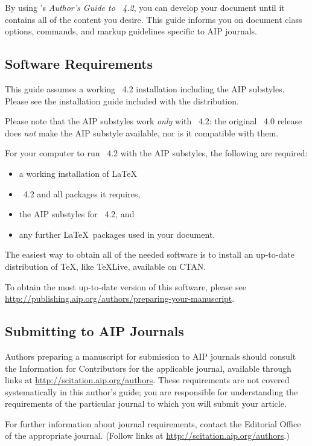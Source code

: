 \documentclass[%
 reprint,%
 amssymb, amsmath,%
 aip,cha,%
]{revtex4-2}
\begin{document}
By using \revtex's \textit{Author's Guide to \revtex~4.2}, you can develop your
document until it contains all of the content you desire.
This guide informs you on document class options, commands, and 
markup guidelines specific to AIP journals. 

\subsection{Software Requirements}

This guide assumes a working \revtex~4.2 installation including the AIP substyles. 
Please see the installation guide included with the distribution.\cite{Note1}

Please note that the AIP substyles work {\it only} with \revtex~4.2: 
the original \revtex~4.0 release does {\it not} make the AIP substyle available, nor is it compatible with them. 

For your computer to run \revtex~4.2 with the AIP substyles, the following are required:
\begin{itemize}
\item
a working installation of \LaTeX\,
\item
\revtex~4.2 and all packages it requires,
\item
the AIP substyles for \revtex~4.2, and
\item
any further \LaTeX\ packages used in your document. 
\end{itemize}

The easiest way to obtain all of the needed software is to install an up-to-date distribution of \TeX,
like \TeX Live, available on CTAN.

To obtain the most up-to-date version of this software, please see \url{http://publishing.aip.org/authors/preparing-your-manuscript}.


\subsection{Submitting to AIP Journals}

Authors preparing a manuscript for submission to
AIP journals should consult the Information for Contributors for the applicable journal,
available through links at \url{http://scitation.aip.org/authors}. 
These requirements are not covered systematically in this author's guide; 
you are responsible for understanding the requirements of the particular journal to which
you will submit your article.

For further information about journal requirements, contact the Editorial
Office of the appropriate journal. (Follow links at \url{http://scitation.aip.org/authors}.)
\end{document}
